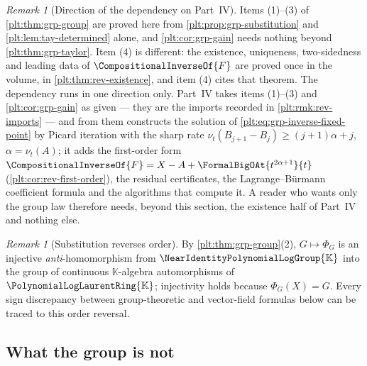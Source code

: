 \documentclass[11pt,oneside]{article}
\theoremstyle{plain}
\theoremstyle{definition}
\theoremstyle{remark}
\newtheorem{remark}[theorem]{Remark}
\newcommand{\K}{\mathbb{K}}
\newcommand{\PLlau}{\PolynomialLogLaurentRing{\K}}       %
\newcommand{\Gnear}{\NearIdentityPolynomialLogGroup{\K}} %
\newcommand{\ordt}{\nu_{t}}                              %
\begin{document}
\begin{remark}[Direction of the dependency on Part~IV]
\label{plt:rmk:grp-dependency}
Items (1)--(3) of \cref{plt:thm:grp-group} are proved here from
\cref{plt:prop:grp-substitution} and \cref{plt:lem:tay-determined} alone, and
\cref{plt:cor:grp-gain} needs nothing beyond \cref{plt:thm:grp-taylor}.  Item
(4) is different: the existence, uniqueness, two-sidedness and leading data of
\(\CompositionalInverseOf{F}\) are proved once in the volume, in
\cref{plt:thm:rev-existence}, and item (4) cites that theorem.  The
dependency runs in one direction only.  Part~IV takes items (1)--(3) and
\cref{plt:cor:grp-gain} as given --- they are the imports recorded in
\cref{plt:rmk:rev-imports} --- and from them constructs the solution of
\eqref{plt:eq:grp-inverse-fixed-point} by Picard iteration with the sharp rate
\(\ordt(B_{j+1}-B_j)\ge(j+1)\alpha+j\), \(\alpha=\ordt(A)\); it adds the
first-order form
\(\CompositionalInverseOf{F}=X-A+\FormalBigOAt{t^{2\alpha+1}}{t}\)
(\cref{plt:cor:rev-first-order}), the residual certificates, the
Lagrange--B\"urmann coefficient formula and the algorithms that compute it.  A
reader who wants only the group law therefore needs, beyond this section, the
existence half of Part~IV and nothing else.
\end{remark}

\begin{remark}[Substitution reverses order]\label{plt:rmk:grp-anti}
By \cref{plt:thm:grp-group}(2), \(G\mapsto\Phi_G\) is an injective
\emph{anti}-homomorphism from \(\Gnear\) into the group of continuous
\(\K\)-algebra automorphisms of \(\PLlau\); injectivity holds because
\(\Phi_G(X)=G\).  Every sign discrepancy between group-theoretic and
vector-field formulas below can be traced to this order reversal.
\end{remark}

\subsection{What the group is not}
\end{document}

